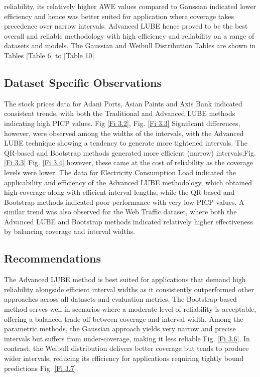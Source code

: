 reliability, its relatively higher AWE values compared to Gaussian indicated lower efficiency and hence was better suited for application where coverage takes precedence over narrow intervals. Advanced LUBE hence proved to be the best overall and reliable methodology with high efficiency and reliability on a range of datasets and models. The Gaussian and Weibull Distribution Tables are shown in Tables \ref{Table 6} to \ref{Table 10}.

\subsection{Dataset Specific Observations}
The stock prices data for Adani Ports, Asian Paints and Axis Bank indicated consistent trends, with both the Traditional and Advanced LUBE methods indicating high PICP values. Fig \ref{Fi 3.2}, Fig. \ref{Fi 3.3} Significant differences, however, were observed among the widths of the intervals, with the Advanced LUBE technique showing a tendency to generate more tightened intervals. The QR-based and Bootstrap methods generated more efficient (narrow) intervals;Fig. \ref{Fi 3.3} Fig. \ref{Fi 3.4} however, these came at the cost of reliability as the coverage levels were lower. The data for Electricity Consumption Load indicated the applicability and efficiency of the Advanced LUBE methodology, which obtained high coverage along with efficient interval lengths, while the QR-based and Bootstrap methods indicated poor performance with very low PICP values. A similar trend was also observed for the Web Traffic dataset, where both the Advanced LUBE and Bootstrap methods indicated relatively higher effectiveness by balancing coverage and interval widths.

\subsection{Recommendations}
The Advanced LUBE method is best suited for applications that demand high reliability alongside efficient interval widths as it consistently outperformed other approaches across all datasets and evaluation metrics. The Bootstrap-based method serves well in scenarios where a moderate level of reliability is acceptable, offering a balanced trade-off between coverage and interval width. Among the parametric methods, the Gaussian approach yields very narrow and precise intervals but suffers from under-coverage, making it less reliable Fig. \ref{Fi 3.6}. In contrast, the Weibull distribution delivers better coverage but tends to produce wider intervals, reducing its efficiency for applications requiring tightly bound predictions Fig. \ref{Fi 3.7}.

